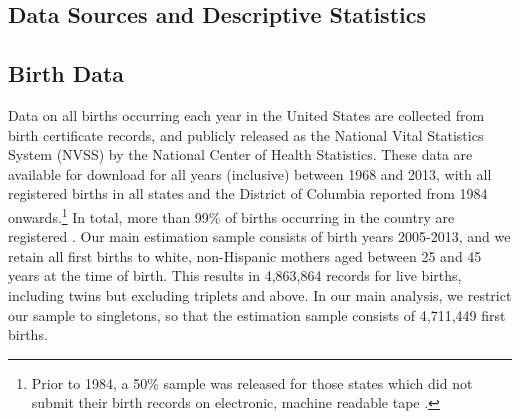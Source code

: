 \documentclass[a4paper, 12 pt]{article}
\theoremstyle{plain}
\begin{document}
\begin{doublespace}
\section{Data Sources and Descriptive Statistics}
\subsection{Birth Data}
\label{bqSscn:USAdata}
Data on all births occurring each year in the United States are collected from
birth certificate records, and publicly released as the National Vital
Statistics System (NVSS) by the National Center of Health Statistics. These data
are available for download for all years (inclusive) between 1968 and 2013, with
all registered births in all states and the District of Columbia reported from
1984 onwards.\footnote{Prior to 1984, a 50\% sample was released for those
states which did not submit their birth records on electronic, machine readable
tape \citep{Martinetal2015}.}  In total, more than 99\% of births occurring
in the country are registered \citep{Martinetal2015}. Our main estimation
sample consists of birth years 2005-2013, and we retain all first births to white, non-Hispanic mothers aged between 25 and 45 years at the time
of birth.  This results in 4,863,864 records for live births, including twins but excluding triplets and above.
In our main analysis, we restrict our sample to singletons, so that the estimation sample consists of 4,711,449 first births.


\end{doublespace}
\end{document}
